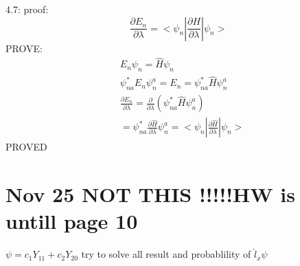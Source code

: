 \documentclass{article}
\begin{document}
  4.7:
proof:
\begin{equation}
  \frac{ \partial E_n}{ \partial \lambda}=<\psi_n|\frac{ \partial H}{ \partial \lambda}|\psi_n>
\end{equation}
PROVE:
  \begin{align*}
    &E_n\psi_n=\hat H\psi_n \\
    &\psi^*_{na}E_n\psi_n^a=E_n=\psi^*_{na}\hat H\psi_n^a \\
    &\frac{ \partial E_n}{ \partial \lambda}=\frac{ \partial }{ \partial \lambda}(\psi^*_{na}\hat H\psi_n^a)\\
    &=\psi^*_{na}\frac{ \partial \hat H}{ \partial \lambda}\psi_n^a=<\psi_n|\frac{ \partial \hat H}{ \partial \lambda}|\psi_n>
  \end{align*}
  PROVED

  \newpage
  \section{Nov 25 NOT THIS !!!!!HW is untill page 10}
  $\psi=c_1Y_{11}+c_2Y_{20}$ try to solve all result and probablility of $\hat l_x\psi$
  
\end{document}
